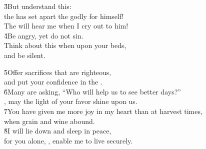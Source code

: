 \begin{poetry}
\poeml \v{3}But understand this: \\
\poemll    the  has set apart the godly for himself! \\
\poemlll       The  will hear me when I cry out to him! \\
\poeml \v{4}Be angry, yet do not sin. \\
\poemll    Think about this when upon your beds, \\
\poemlll       and be silent.
\end{poetry}

\begin{poetry}
\poeml \v{5}Offer sacrifices that are righteous, \\
\poemll    and put your confidence in the . \\
\poeml \v{6}Many are asking, ``Who will help us to see better days?'' \\
\poemll    {}, may the light of your favor shine upon us. \\
\poeml \v{7}You have given me more joy in my heart than at harvest times, \\
\poemll    when grain and wine abound. \\
\poeml \v{8}I will lie down and sleep in peace, \\
\poemll    for you alone, , enable me to live securely.
\end{poetry}

